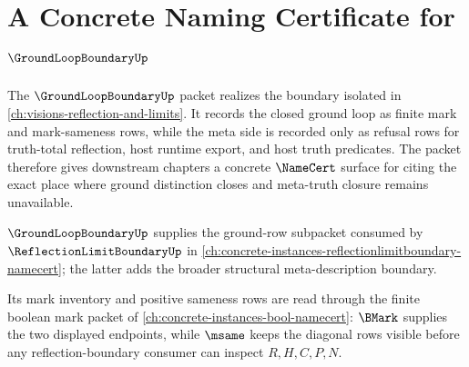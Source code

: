\chapter{A Concrete Naming Certificate for $\GroundLoopBoundaryUp$}
\label{ch:concrete-instances-groundloopboundary-namecert}

The $\GroundLoopBoundaryUp$ packet realizes the boundary isolated in \autoref{ch:visions-reflection-and-limits}. It records the closed ground loop as finite mark and mark-sameness rows, while the meta side is recorded only as refusal rows for truth-total reflection, host runtime export, and host truth predicates. The packet therefore gives downstream chapters a concrete $\NameCert$ surface for citing the exact place where ground distinction closes and meta-truth closure remains unavailable.

$\GroundLoopBoundaryUp$ supplies the ground-row subpacket consumed by $\ReflectionLimitBoundaryUp$ in \autoref{ch:concrete-instances-reflectionlimitboundary-namecert}; the latter adds the broader structural meta-description boundary.

Its mark inventory and positive sameness rows are read through the finite boolean mark packet of \autoref{ch:concrete-instances-bool-namecert}: $\BMark$ supplies the two displayed endpoints, while $\msame$ keeps the diagonal rows visible before any reflection-boundary consumer can inspect $R,H,C,P,N$.

